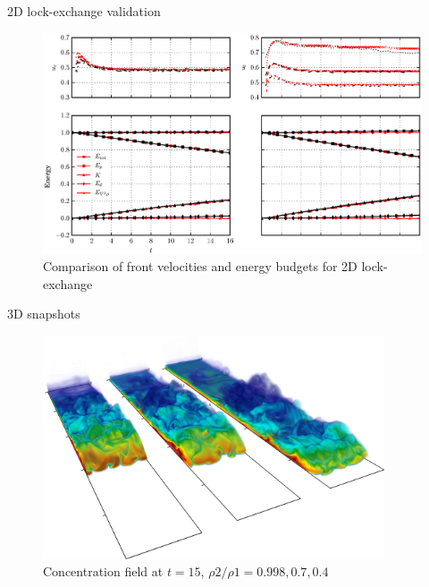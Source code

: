 \documentclass[presentation]{beamer}
\begin{document}
\begin{frame}[label={sec:org0863305}]{2D lock-exchange validation}
\begin{figure}[htbp]
\centering
\includegraphics[width=.9\linewidth]{./figures/front_velocity_ebudg_veri.eps}
\caption{Comparison of front velocities and energy budgets for 2D lock-exchange}
\end{figure}
\end{frame}

\begin{frame}[label={sec:orgd3bab12}]{3D snapshots}
\begin{figure}[htbp]
\centering
\includegraphics[width=0.9\textwidth]{./figures/3D_view.eps}
\caption{Concentration field at \(t=15\), \(\rho2/\rho1=0.998, 0.7, 0.4\)}
\end{figure}
\end{frame}
\end{document}
